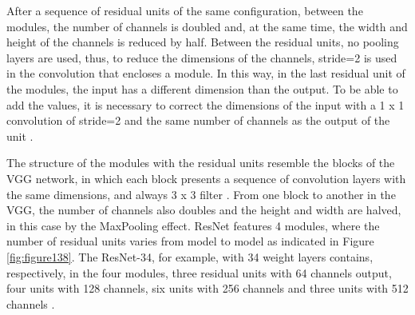 After a sequence of residual units of the same configuration, between the modules, the number of channels is doubled and, at the same time, the width and height of the channels is reduced by half. Between the residual units, no pooling layers are used, thus, to reduce the dimensions of the channels, stride=2 is used in the convolution that encloses a module. In this way, in the last residual unit of the modules, the input has a different dimension than the output. To be able to add the values, it is necessary to correct the dimensions of the input with a 1 x 1 convolution of stride=2 and the same number of channels as the output of the unit    \cite{zhang2020dive}.

The structure of the modules with the residual units resemble the blocks of the VGG network, in which each block presents a sequence of convolution layers with the same dimensions, and always 3 x 3 filter . From one block to another in the VGG, the number of channels also doubles and the height and width are halved, in this case by the MaxPooling effect. ResNet features 4 modules, where the number of residual units varies from model to model as indicated in Figure \ref{fig:figure138}. The ResNet-34, for example, with 34 weight layers contains, respectively, in the four modules, three residual units with 64 channels output, four units with 128 channels, six units with 256 channels and three units with 512 channels \cite{he2016}.

